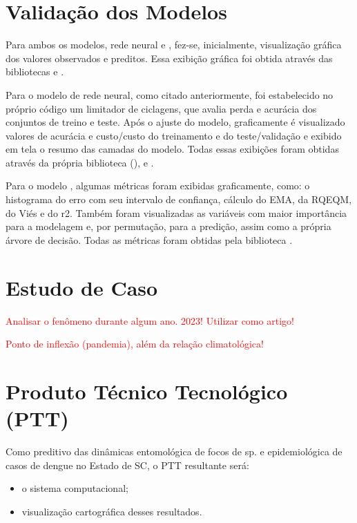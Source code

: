 \documentclass[
	12pt,				%
	openright,			%
	oneside,			%
	a4paper,			%
	english,			%
	french,				%
	spanish,			%
	brazil				%
	dvipsnames, table]{abntex2}
\begin{document}
\section{Validação dos Modelos}

\indent Para ambos os modelos, rede neural e , fez-se, inicialmente, visualização gráfica dos valores observados e preditos. Essa exibição gráfica foi obtida através das bibliotecas  e .

\indent Para o modelo de rede neural, como citado anteriormente, foi estabelecido no próprio código um limitador de ciclagens, que avalia perda e acurácia dos conjuntos de treino e teste. Após o ajuste do modelo, graficamente é visualizado valores de acurácia e custo/custo do treinamento e do teste/validação e exibido em tela o resumo das camadas do modelo. Todas essas exibições foram obtidas através da própria biblioteca (),  e .

\indent Para o modelo , algumas métricas foram exibidas graficamente, como: o histograma do erro com seu intervalo de confiança, cálculo do \acrfull{EMA}, da \acrfull{RQEQM}, do Viés e do \acrfull{r2}. Também foram visualizadas as variáveis com maior importância para a modelagem e, por permutação, para a predição, assim como a própria árvore de decisão. Todas as métricas foram obtidas pela biblioteca .

\section{Estudo de Caso}

\indent \textcolor{red}{Analisar o fenômeno durante algum ano. 2023! Utilizar como artigo!}

\indent \textcolor{red}{Ponto de inflexão (pandemia), além da relação climatológica!}

\section{Produto Técnico Tecnológico (PTT)}

\indent Como preditivo das dinâmicas entomológica de focos de  sp. e epidemiológica de casos de dengue no Estado de \acrlong{SC}, o \acrshort{PTT} resultante será:

\begin{itemize}
  \item o sistema computacional;
  \item visualização cartográfica desses resultados.
\end{itemize}
\end{document}

